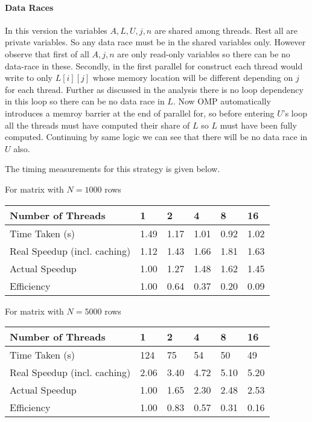 \documentclass{article}
\begin{document}
\paragraph{Data Races} In this version the variables $A, L, U, j, n$ are shared among threads. Rest all are private variables. So any data race must be in the shared variables only. However observe that first of all $A, j, n$ are only read-only variables so there can be no data-race in these. Secondly, in the first parallel for construct each thread would write to only $L[i][j]$ whose memory location will be different depending on $j$ for each thread. Further as discussed in the analysis there is no loop dependency in this loop so there can be no data race in $L$. Now OMP automatically introduces a memroy barrier at the end of parallel for, so before entering $U$'s loop all the threads must have computed their share of $L$ so $L$ must have been fully computed. Continuing by same logic we can see that there will be no data race in $U$ also.

The timing measurements for this strategy is given below.

For matrix with $N=1000$ rows

\begin{table}[H]
\centering
\begin{tabular}{l|lllll}
Number of Threads            & 1    & 2    & 4    & 8    & 16   \\ \hline
Time Taken (s)               & 1.49 & 1.17 & 1.01 & 0.92 & 1.02 \\
Real Speedup (incl. caching) & 1.12 & 1.43 & 1.66 & 1.81 & 1.63 \\
Actual Speedup               & 1.00 & 1.27 & 1.48 & 1.62 & 1.45 \\
Efficiency                   & 1.00 & 0.64 & 0.37 & 0.20 & 0.09
\end{tabular}
\end{table}

For matrix with $N=5000$ rows

\begin{table}[H]
\centering
\begin{tabular}{l|lllll}
Number of Threads            & 1    & 2    & 4    & 8    & 16   \\ \hline
Time Taken (s)               & 124  & 75   & 54   & 50   & 49   \\
Real Speedup (incl. caching) & 2.06 & 3.40 & 4.72 & 5.10 & 5.20 \\
Actual Speedup               & 1.00 & 1.65 & 2.30 & 2.48 & 2.53 \\
Efficiency                   & 1.00 & 0.83 & 0.57 & 0.31 & 0.16
\end{tabular}
\end{table}
\end{document}
